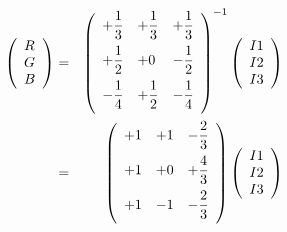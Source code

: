 \documentclass{article}
\begin{document}
\begin{eqnarray*} \left( \begin{array}{l} R \\ G \\ B \\ \end{array} \right) &=& \left( \begin{array}{lll} +\dfrac{1}{3} & +\dfrac{1}{3} & +\dfrac{1}{3} \vspace{.5em} \\ +\dfrac{1}{2} & +0 & -\dfrac{1}{2} \vspace{.5em} \\ -\dfrac{1}{4} & +\dfrac{1}{2} & -\dfrac{1}{4} \vspace{.5em} \\ \end{array} \right)^{-1} \left( \begin{array}{l} I1 \\ I2 \\ I3 \\ \end{array} \right) \\ &=& \left( \begin{array}{lll} +1 & +1 & -\dfrac{2}{3} \vspace{.5em} \\ +1 & +0 & +\dfrac{4}{3} \vspace{.5em} \\ +1 & -1 & -\dfrac{2}{3} \vspace{.5em} \\ \end{array} \right) \left( \begin{array}{l} I1 \\ I2 \\ I3 \\ \end{array} \right) \\ \end{eqnarray*}
\pagebreak
\end{document}

